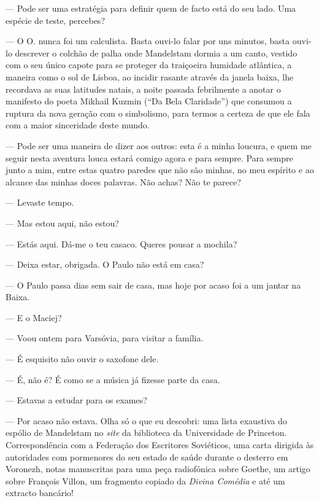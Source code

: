 --- Pode ser uma estratégia para definir quem de facto está do seu lado.
  Uma espécie de teste, percebes?

--- O O. nunca foi um calculista. Basta ouvi-lo falar por uns minutos,
  basta ouvi-lo descrever o colchão de palha onde Mandelstam dormia a um
  canto, vestido com o seu único capote para se proteger da traiçoeira
  humidade atlântica, a maneira como o sol de Lisboa, ao incidir rasante
  através da janela baixa, lhe recordava as suas latitudes natais, a
  noite passada febrilmente a anotar o manifesto do poeta Mikhail Kuzmin
  (``Da Bela Claridade'') que consumou a ruptura da
nova geração com o simbolismo, para termos a certeza de que ele fala com
a maior sinceridade deste mundo.

--- Pode ser uma maneira de dizer aos outros: esta é a minha loucura, e
  quem me seguir nesta aventura louca estará comigo agora e para sempre.
  Para sempre junto a mim, entre estas quatro paredes que não são
  minhas, no meu espírito e ao alcance das minhas doces palavras. Não
  achas? Não te parece?

\medskip
\asterisc
\medskip

--- Levaste tempo.

--- Mas estou aqui, não estou?

--- Estás aqui. Dá-me o teu casaco. Queres pousar a mochila?

--- Deixa estar, obrigada. O Paulo não está em casa?

--- O Paulo passa dias sem sair de casa, mas hoje por acaso foi a um
  jantar na Baixa.

--- E o Maciej?

--- Voou ontem para Varsóvia, para visitar a família.

--- É esquisito não ouvir o saxofone dele.

--- É, não é? É como se a música já fizesse parte da casa.

--- Estavas a estudar para os exames?

--- Por acaso não estava. Olha só o que eu descobri: uma lista exaustiva
  do espólio de Mandelstam no \emph{site }da biblioteca da
  Universidade de Princeton. Correspondência com a Federação dos
  Escritores Soviéticos, uma carta dirigida às autoridades com
  pormenores do seu estado de saúde durante o desterro em Voronezh,
  notas manuscritas para uma peça radiofónica sobre Goethe, um artigo
  sobre François Villon,
um fragmento copiado da \emph{Divina Comédia }e até um extracto
bancário!

